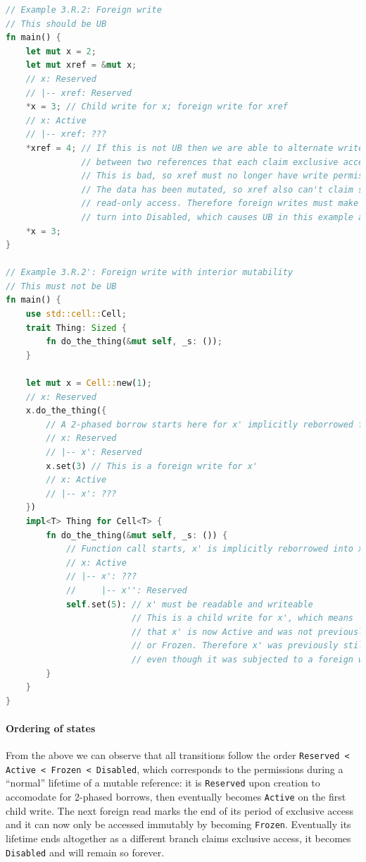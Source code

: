 \documentclass[a4paper,11pt]{article}
\theoremstyle{plain}
\theoremstyle{definition}
\theoremstyle{remark}
\newcommand{\tperm}[1]{\texttt{#1}}
\begin{document}
\begin{lstlisting}[language=rust]
// Example 3.R.2: Foreign write
// This should be UB
fn main() {
    let mut x = 2;
    let mut xref = &mut x;
    // x: Reserved
    // |-- xref: Reserved
    *x = 3; // Child write for x; foreign write for xref
    // x: Active
    // |-- xref: ???
    *xref = 4; // If this is not UB then we are able to alternate writes
               // between two references that each claim exclusive access.
               // This is bad, so xref must no longer have write permissions.
               // The data has been mutated, so xref also can't claim shared
               // read-only access. Therefore foreign writes must make Reserved
               // turn into Disabled, which causes UB in this example as desired.
    *x = 3;
}

// Example 3.R.2': Foreign write with interior mutability
// This must not be UB
fn main() {
    use std::cell::Cell;
    trait Thing: Sized {
        fn do_the_thing(&mut self, _s: ());
    }

    let mut x = Cell::new(1);
    // x: Reserved
    x.do_the_thing({
        // A 2-phased borrow starts here for x' implicitly reborrowed from x
        // x: Reserved
        // |-- x': Reserved
        x.set(3) // This is a foreign write for x'
        // x: Active
        // |-- x': ???
    })
    impl<T> Thing for Cell<T> {
        fn do_the_thing(&mut self, _s: ()) {
            // Function call starts, x' is implicitly reborrowed into x''
            // x: Active
            // |-- x': ???
            //     |-- x'': Reserved
            self.set(5): // x' must be readable and writeable
                         // This is a child write for x', which means
                         // that x' is now Active and was not previously Disabled
                         // or Frozen. Therefore x' was previously still Reserved,
                         // even though it was subjected to a foreign write.
        }
    }
}
\end{lstlisting}

\paragraph*{Ordering of states}

From the above we can observe that all transitions follow the order
\tperm{Reserved < Active < Frozen < Disabled}, which corresponds to the permissions
during a ``normal'' lifetime of a mutable reference: it is \tperm{Reserved} upon creation
to accomodate for 2-phased borrows, then eventually becomes \tperm{Active} on the first
child write. The next foreign read marks the end of its period of exclusive access
and it can now only be accessed immutably by becoming \tperm{Frozen}. Eventually its
lifetime ends altogether as a different branch claims exclusive access, it
becomes \tperm{Disabled} and will remain so forever.
\end{document}
